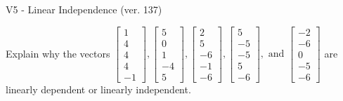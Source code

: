 \begin{exercise}
  \begin{exerciseTitle}V5 - Linear Independence (ver. 137)\end{exerciseTitle}
  \begin{exerciseStatement}
    Explain why the vectors \(\left[\begin{array}{r}
1 \\
4 \\
4 \\
4 \\
-1
\end{array}\right] , \left[\begin{array}{r}
5 \\
0 \\
1 \\
-4 \\
5
\end{array}\right] , \left[\begin{array}{r}
2 \\
5 \\
-6 \\
-1 \\
-6
\end{array}\right] , \left[\begin{array}{r}
5 \\
-5 \\
-5 \\
5 \\
-6
\end{array}\right] , \text{ and } \left[\begin{array}{r}
-2 \\
-6 \\
0 \\
-5 \\
-6
\end{array}\right]\) are linearly dependent or linearly independent.	



\end{exerciseStatement}
\end{exercise}
